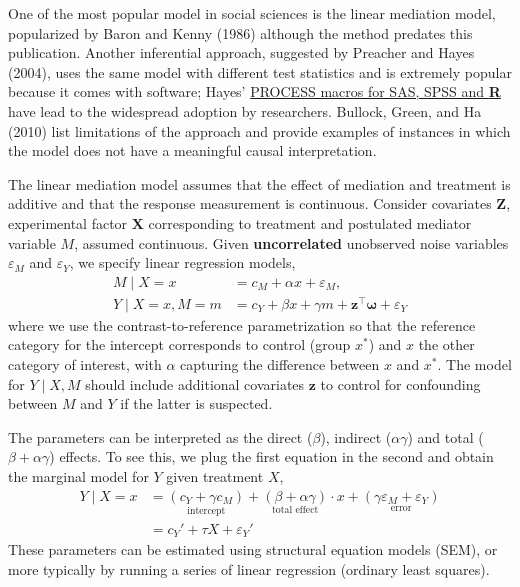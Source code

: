 \documentclass[
  11pt,
  letterpaper,
]{scrbook}
\theoremstyle{definition}
\theoremstyle{remark}
\begin{document}
One of the most popular model in social sciences is the linear mediation
model, popularized by Baron and Kenny (1986) although the method
predates this publication. Another inferential approach, suggested by
Preacher and Hayes (2004), uses the same model with different test
statistics and is extremely popular because it comes with software;
Hayes' \href{https://www.processmacro.org/index.html}{PROCESS macros for
SAS, SPSS and \textbf{R}} have lead to the widespread adoption by
researchers. Bullock, Green, and Ha (2010) list limitations of the
approach and provide examples of instances in which the model does not
have a meaningful causal interpretation.

The linear mediation model assumes that the effect of mediation and
treatment is additive and that the response measurement is continuous.
Consider covariates \(\mathbf{Z}\), experimental factor \(\mathbf{X}\)
corresponding to treatment and postulated mediator variable \(M\),
assumed continuous. Given \textbf{uncorrelated} unobserved noise
variables \(\varepsilon_M\) and \(\varepsilon_Y\), we specify linear
regression models, \begin{align*}
M \mid X=x &= c_M + \alpha x + \varepsilon_M,\\
Y \mid X=x, M=m &=  c_Y + \beta x + \gamma m + \mathbf{z}^\top\boldsymbol{\omega} + \varepsilon_Y
\end{align*} where we use the contrast-to-reference parametrization so
that the reference category for the intercept corresponds to control
(group \(x^*\)) and \(x\) the other category of interest, with
\(\alpha\) capturing the difference between \(x\) and \(x^*\). The model
for \(Y \mid X, M\) should include additional covariates \(\mathbf{z}\)
to control for confounding between \(M\) and \(Y\) if the latter is
suspected.

The parameters can be interpreted as the direct (\(\beta\)), indirect
(\(\alpha \gamma\)) and total (\(\beta + \alpha \gamma\)) effects. To
see this, we plug the first equation in the second and obtain the
marginal model for \(Y\) given treatment \(X\), \begin{align}
Y \mid X=x &= \underset{\text{intercept}}{(c_Y + \gamma c_M)} + \underset{\text{total effect}}{(\beta + \alpha\gamma)}\cdot x + \underset{\text{error}}{(\gamma \varepsilon_M + \varepsilon_Y)}\\
&= c_Y' + \tau X + \varepsilon_Y'
\end{align} These parameters can be estimated using structural equation
models (SEM), or more typically by running a series of linear regression
(ordinary least squares).
\end{document}
